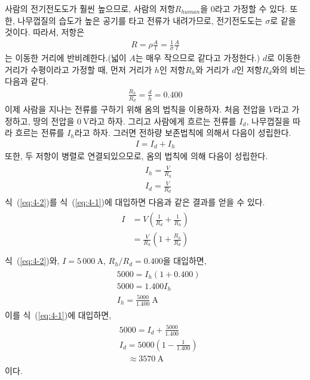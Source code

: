 \documentclass[tightenlines,floatfix,nofootinbib,superscriptaddress,fleqn]{revtex4}
\begin{document}
사람의 전기전도도가 훨씬 높으므로, 사람의 저항$R_{human}$을 $0$라고 가정할 수
있다. 또한, 나무껍질의 습도가 높은 공기를 타고 전류가 내려가므로, 전기전도도는
$\sigma$로 같을 것이다. 따라서, 저항은
\begin{align}
  R=\rho\frac{A}{l}=\frac{1}{\sigma}\frac{A}{l}
\end{align}
는 이동한 거리에 반비례한다.(넓이 $A$는 매우 작으므로 같다고 가정한다.)
$d$로 이동한 거리가 수평이라고 가정할 때, 먼저 거리가 $h$인 저항$R_h$와
거리가 $d$인 저항$R_d$와의 비는 다음과 같다.
\begin{align}
  \frac{R_h}{R_d}=\frac{d}{h}=0.400
\end{align}
이제 사람을 지나는 전류를 구하기 위해 옴의 법칙을 이용하자. 처음 전압을
$V$라고 가정하고, 땅의 전압을 $0~\mathrm{V}$라고 하자. 그리고 사람에게
흐르는 전류를 $I_d$, 나무껍질을 따라 흐르는 전류를 $I_h$라고 하자. 그러면
전하량 보존법칙에 의해서 다음이 성립한다.
\begin{align}
  I=I_d+I_h
  \label{eq:4-1}
\end{align}
또한, 두 저항이 병렬로 연결되있으모로, 옴의 법칙에 의해 다음이 성립한다.
\begin{align}
  \begin{split}
   &I_h=\frac{V}{R_h}\\
   &I_d=\frac{V}{R_d}
   \label{eq:4-2}
  \end{split}
\end{align}
식~(\ref{eq:4-2})를 식~(\ref{eq:4-1})에 대입하면 다음과 같은 결과를 
얻을 수 있다.
\begin{align}
  \begin{split}
   I&=V\left(\frac{1}{R_d}+\frac{1}{R_h}\right)\\
   &=\frac{V}{R_h}\left(1+\frac{R_h}{R_d}\right)\\
  \end{split}
\end{align}
식~(\ref{eq:4-2})와, $I=5\,000~\mathrm{A}$, ${R_h}/{R_d}=0.400$을 대입하면,
\begin{align}
  \begin{split}
   &5000=I_h\left(1+0.400\right)\\
   &5000=1.400I_h\\
   &I_h=\frac{5000}{1.400}~\mathrm{A}
  \end{split}
\end{align}
이를 식~(\ref{eq:4-1})에 대입하면,
\begin{align}
  \begin{split}
    &5000=I_d+\frac{5000}{1.400}\\
    &I_d=5000\left(1-\frac{1}{1.400}\right)\\
    &\quad\approx 3570~\mathrm{A}
  \end{split}
\end{align}
이다.
\end{document}
